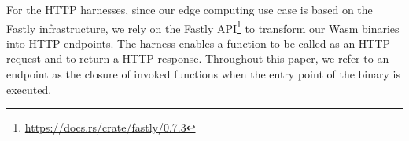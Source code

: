 For the HTTP harnesses, since our edge computing use case is based on the Fastly infrastructure, we rely on the Fastly API\footnote{\url{https://docs.rs/crate/fastly/0.7.3}} to transform our Wasm binaries into HTTP endpoints. The harness enables a function to be called as an HTTP request and to return a HTTP response.
Throughout this paper, we refer to an endpoint as the closure of invoked functions when the entry point of the \wasm binary is executed.

